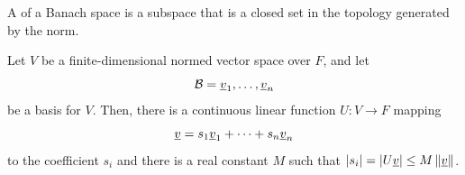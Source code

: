 \begin{definition}
A  of a Banach space is a subspace that is a closed set in the topology generated by the norm.
\end{definition}

\iffalse
\begin{lemma} \label{lemma:FiniteDimExpansionBound}
Let $V$ be a finite-dimensional normed vector space over $F$, and let
\begin{equation*}
\mathcal{B} = \underline{v}_1, \ldots, \underline{v}_n
\end{equation*}
be a basis for $V$.
Then, there is a continuous linear function $U: V \to F$ mapping
\begin{equation*}
\underline{v} = s_1 \underline{v}_1 + \cdots + s_n \underline{v}_n
\end{equation*}
to the coefficient $s_i$ and
there is a real constant $M$ such that $|s_i| = |U \underline{v}| \leq M \left\| \underline{v} \right\|$.
\end{lemma}
